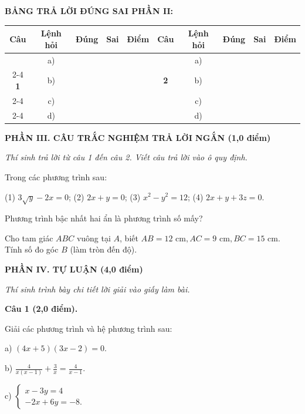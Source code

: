 \documentclass[12pt,a4paper]{article}
\begin{document}
\vspace{1mm}
\noindent\textbf{BẢNG TRẢ LỜI ĐÚNG SAI PHẦN II:}
\begin{center}
\begin{tabular}{|c|c|c|c|c||c|c|c|c|c|}
\hline
\textbf{Câu} & \textbf{Lệnh hỏi} & \textbf{Đúng} & \textbf{Sai} & \textbf{Điểm} & \textbf{Câu} & \textbf{Lệnh hỏi} & \textbf{Đúng} & \textbf{Sai} & \textbf{Điểm} \\
\hline
 & a) & & & & & a) & & & \\
\cline{2-4}\cline{7-9}
\textbf{1} & b) & & & & \textbf{2} & b) & & & \\
\cline{2-4}\cline{7-9}
 & c) & & & & & c) & & & \\
\cline{2-4}\cline{7-9}
 & d) & & & & & d) & & & \\
\hline
\end{tabular}
\end{center}
\vspace{2mm}

\noindent\textbf{\large PHẦN III. CÂU TRẮC NGHIỆM TRẢ LỜI NGẮN (1,0 điểm)}

\textit{Thí sinh trả lời từ câu 1 đến câu 2. Viết câu trả lời vào ô quy định.}

\vspace{1mm}
\begin{ex}
Trong các phương trình sau:\par (1) $3\sqrt{y} - 2x = 0$; \quad (2) $2x + y = 0$; \quad (3) $x^2 - y^2 = 12$; \quad (4) $2x + y + 3z = 0$.\par Phương trình bậc nhất hai ẩn là phương trình số mấy?
\end{ex}

\begin{ex}
Cho tam giác $ABC$ vuông tại $A$, biết $AB = 12\text{ cm}, AC = 9\text{ cm}, BC = 15\text{ cm}$. Tính số đo góc $B$ (làm tròn đến độ).
\end{ex}


\vspace{2mm}
\noindent\textbf{\large PHẦN IV. TỰ LUẬN (4,0 điểm)}

\textit{Thí sinh trình bày chi tiết lời giải vào giấy làm bài.}

\vspace{1mm}
\noindent\textbf{Câu 1 (2,0 điểm).}

Giải các phương trình và hệ phương trình sau:\par a) $(4x + 5)(3x - 2) = 0$.\par b) $\frac{4}{x(x - 1)} + \frac{3}{x} = \frac{4}{x - 1}$.\par c) $\begin{cases} x - 3y = 4 \\ -2x + 6y = -8. \end{cases}$
\end{document}
